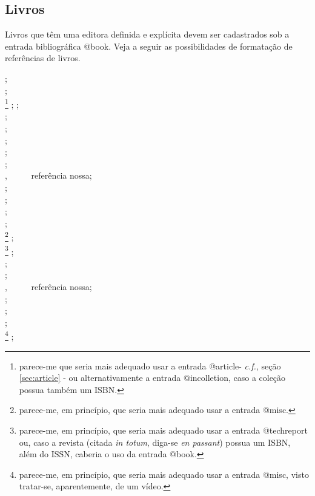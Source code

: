 \begin{apendicesenv}
\section{Livros}
\label{sec:books}

Livros que têm uma editora definida e explícita devem ser cadastrados sob a entrada bibliográfica {\ttfamily @book}. Veja a seguir as possibilidades de formatação de referências de livros.

{\small
	\cite{Albergari1994} ;\\
	\cite{alighieri1983} ;\\
	\cite{brasil1966}\footnote{parece-me que seria mais adequado usar a entrada {\ttfamily @article}- \textit{c.f.}, seção \autoref{sec:article} - ou alternativamente a entrada {\ttfamily @incolletion}, caso a coleção possua também um ISBN.} ;
	\cite{alves1993} ;\\
	\cite{alves1995} ;\\
	\cite{amaral1994} ;\\ 
	\cite{arbex1993} ;\\
	\cite{azevedo1994} ;\\
	\cite{Barabasi2002} ;\\
	\cite{Barbosa2004} , \ \ \ \ \ referência nossa;\\
	\cite{batista1992} ;\\
	\cite{biblica1970} ;\\
	\cite{brasil1988} ;\\
	\cite{brasil1995} ;\\
	\cite{brasil1998}\footnote{parece-me, em princípio, que seria mais adequado usar a entrada {\ttfamily @misc}.} ;\\
	\cite{brasileira1939}\footnote{parece-me, em princípio, que seria mais adequado usar a entrada {\ttfamily @techreport} ou, caso a revista (citada \textit{in totum}, diga-se \textit{en passant}) possua um ISBN, além do ISSN, caberia o uso da entrada {\ttfamily @book}.} ;\\
	\cite{brasileira1993} ;\\
	\cite{britanica1981} ;\\
	\cite{Buerger1989} , \ \ \ \ \ referência nossa;\\
	\cite{cardim1984} ;\\
	\cite{carruth1993} ;\\
	\cite{carvalho1994} ;\\
	\cite{ceravi1983}\footnote{parece-me, em princípio, que seria mais adequado usar a entrada {\ttfamily @misc}, visto tratar-se, aparentemente, de um vídeo.} ;\\
}
\end{apendicesenv}
